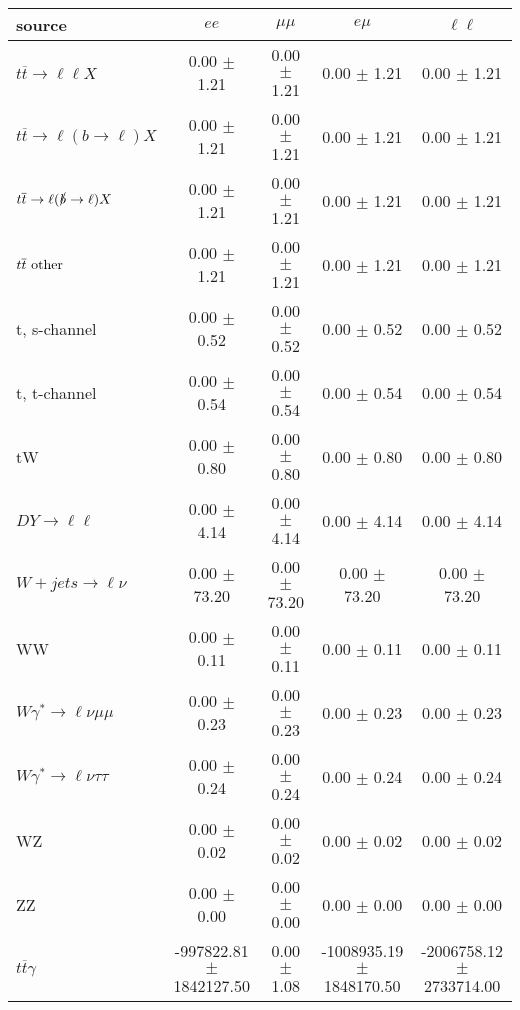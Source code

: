 \begin{tabular}{l|cccc} \hline\hline
source & $ee$ & $\mu\mu$ & $e\mu$ & $\ell\ell $ \\
\hline
$t\overline{t} \rightarrow \ell \ell X$ &  0.00 $\pm$  1.21 &  0.00 $\pm$  1.21 &  0.00 $\pm$  1.21 &  0.00 $\pm$  1.21 \\
$t\overline{t} \rightarrow \ell (b \rightarrow \ell) X$ &  0.00 $\pm$  1.21 &  0.00 $\pm$  1.21 &  0.00 $\pm$  1.21 &  0.00 $\pm$  1.21 \\
$t\overline{t} \rightarrow \ell (\slashed b \rightarrow \ell) X$ &  0.00 $\pm$  1.21 &  0.00 $\pm$  1.21 &  0.00 $\pm$  1.21 &  0.00 $\pm$  1.21 \\
        $t\overline{t}\ \rm{other}$ &  0.00 $\pm$  1.21 &  0.00 $\pm$  1.21 &  0.00 $\pm$  1.21 &  0.00 $\pm$  1.21 \\
\hline
                       t, s-channel &  0.00 $\pm$  0.52 &  0.00 $\pm$  0.52 &  0.00 $\pm$  0.52 &  0.00 $\pm$  0.52 \\
                       t, t-channel &  0.00 $\pm$  0.54 &  0.00 $\pm$  0.54 &  0.00 $\pm$  0.54 &  0.00 $\pm$  0.54 \\
                                 tW &  0.00 $\pm$  0.80 &  0.00 $\pm$  0.80 &  0.00 $\pm$  0.80 &  0.00 $\pm$  0.80 \\
\hline
         $DY \rightarrow \ell \ell$ &  0.00 $\pm$  4.14 &  0.00 $\pm$  4.14 &  0.00 $\pm$  4.14 &  0.00 $\pm$  4.14 \\
      $W+jets \rightarrow \ell \nu$ &  0.00 $\pm$ 73.20 &  0.00 $\pm$ 73.20 &  0.00 $\pm$ 73.20 &  0.00 $\pm$ 73.20 \\
                                 WW &  0.00 $\pm$  0.11 &  0.00 $\pm$  0.11 &  0.00 $\pm$  0.11 &  0.00 $\pm$  0.11 \\
\hline
$W\gamma^{*} \rightarrow \ell \nu \mu\mu$ &  0.00 $\pm$  0.23 &  0.00 $\pm$  0.23 &  0.00 $\pm$  0.23 &  0.00 $\pm$  0.23 \\
$W\gamma^{*} \rightarrow \ell \nu \tau\tau$ &  0.00 $\pm$  0.24 &  0.00 $\pm$  0.24 &  0.00 $\pm$  0.24 &  0.00 $\pm$  0.24 \\
                                 WZ &  0.00 $\pm$  0.02 &  0.00 $\pm$  0.02 &  0.00 $\pm$  0.02 &  0.00 $\pm$  0.02 \\
                                 ZZ &  0.00 $\pm$  0.00 &  0.00 $\pm$  0.00 &  0.00 $\pm$  0.00 &  0.00 $\pm$  0.00 \\
\hline
              $t\overline{t}\gamma$ & -997822.81 $\pm$ 1842127.50 &  0.00 $\pm$  1.08 & -1008935.19 $\pm$ 1848170.50 & -2006758.12 $\pm$ 2733714.00 \\

\end{tabular}
